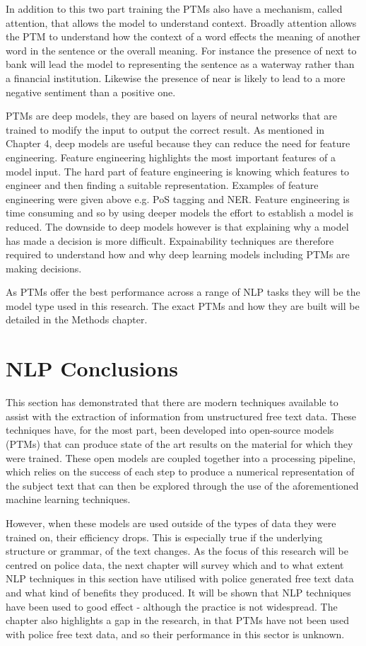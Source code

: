 In addition to this two part training the PTMs also have a mechanism, called attention, that allows the model to understand context. Broadly attention allows the PTM to understand how the context of a word effects the meaning of another word in the sentence or the overall meaning. For instance the presence of  next to {bank} will lead the model to representing the sentence as a waterway rather than a financial institution. Likewise the presence of  near  is likely to lead to a more negative sentiment than a positive one.

PTMs are deep models, they are based on layers of neural networks that are trained to modify the input to output the correct result. As mentioned in Chapter 4, deep models are useful because they can reduce the need for feature engineering. Feature engineering highlights the most important features of a model input. The hard part of feature engineering is knowing which features to engineer and then finding a suitable representation. Examples of feature engineering were given above e.g. PoS tagging and NER.   Feature engineering is time consuming and so by using deeper models the effort to establish a model is reduced. The downside to deep models however is that explaining why a model has made a decision is more difficult. Expainability techniques are therefore required to understand how and why deep learning models including PTMs are making decisions.

As PTMs offer the best performance across a range of NLP tasks they will be the model type used in this research. The exact PTMs and how they are built will be detailed in the Methods chapter. 

\section{ NLP Conclusions} This section has demonstrated that there are modern techniques available to assist with the extraction of information from unstructured free text data. These techniques have, for the most part, been developed into open-source models (PTMs) that can produce state of the art results on the material for which they were trained. These open models are coupled together into a processing pipeline, which relies on the success of each step to produce a numerical representation of the subject text that can then be explored through the use of the aforementioned machine learning techniques.

However, when these models are used outside of the types of data they were trained on, their efficiency drops. This is especially true if the underlying structure or grammar, of the text changes. As the focus of this research will be centred on police data, the next chapter will survey which and to what extent NLP techniques in this section have utilised with police generated free text data and what kind of benefits they produced. It will be shown that NLP techniques have been used to good effect - although the practice is not widespread. The chapter also highlights a gap in the research, in that PTMs have not been used with police free text data, and so their performance in this sector is unknown.

